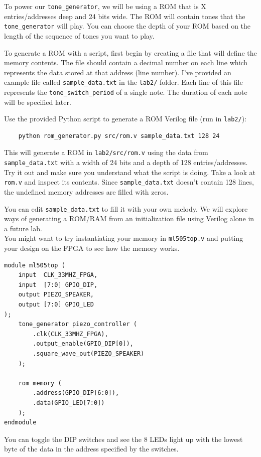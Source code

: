 \documentclass[11pt]{article}
\begin{document}
To power our \verb|tone_generator|, we will be using a ROM that is X entries/addresses deep and 24 bits wide. The ROM will contain tones that the \verb|tone_generator| will play. You can choose the depth of your ROM based on the length of the sequence of tones you want to play.

To generate a ROM with a script, first begin by creating a file that will define the memory contents. The file should contain a decimal number on each line which represents the data stored at that address (line number). I've provided an example file called \verb|sample_data.txt| in the \verb|lab2/| folder. Each line of this file represents the \verb|tone_switch_period| of a single note. The duration of each note will be specified later.

Use the provided Python script to generate a ROM Verilog file (run in \verb|lab2/|):

\begin{verbatim}
	python rom_generator.py src/rom.v sample_data.txt 128 24
\end{verbatim}

This will generate a ROM in \verb|lab2/src/rom.v| using the data from \verb|sample_data.txt| with a width of 24 bits and a depth of 128 entries/addresses. Try it out and make sure you understand what the script is doing. Take a look at \verb|rom.v| and inspect its contents. Since \verb|sample_data.txt| doesn't contain 128 lines, the undefined memory addresses are filled with zeros.

You can edit \verb|sample_data.txt| to fill it with your own melody. We will explore ways of generating a ROM/RAM from an initialization file using Verilog alone in a future lab.\\

You might want to try instantiating your memory in \verb|ml505top.v| and putting your design on the FPGA to see how the memory works.

\begin{verbatim}
module ml505top (
	input  CLK_33MHZ_FPGA,
	input  [7:0] GPIO_DIP,
	output PIEZO_SPEAKER,
	output [7:0] GPIO_LED
);    
	tone_generator piezo_controller (
		.clk(CLK_33MHZ_FPGA),
		.output_enable(GPIO_DIP[0]),
		.square_wave_out(PIEZO_SPEAKER)
	);

	rom memory (
		.address(GPIO_DIP[6:0]),
		.data(GPIO_LED[7:0])
	);
endmodule
\end{verbatim}

You can toggle the DIP switches and see the 8 LEDs light up with the lowest byte of the data in the address specified by the switches.
\end{document}
